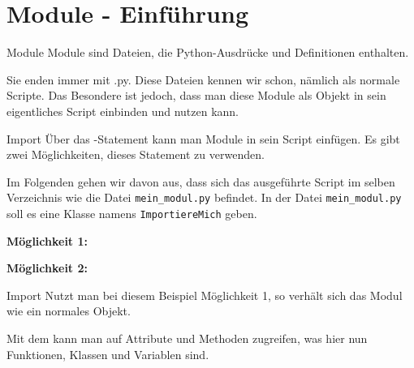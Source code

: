 \section{Module - Einführung}
\begin{frame}{Module}
	Module sind Dateien, die Python-Ausdrücke und Definitionen enthalten. 
	
	Sie enden immer mit \alert{.py}. Diese Dateien kennen wir schon, nämlich als normale Scripte. Das Besondere ist jedoch, dass man diese Module als Objekt in sein eigentliches Script einbinden und nutzen kann.
	
\end{frame}

\begin{frame}{Import}
	Über das -Statement kann man Module in sein Script einfügen. Es gibt zwei Möglichkeiten, dieses Statement zu verwenden.
	
	 Im Folgenden gehen wir davon aus, dass sich das ausgeführte Script im selben Verzeichnis wie die Datei \texttt{mein\_modul.py} befindet. In der Datei \texttt{mein\_modul.py} soll es eine Klasse namens \texttt{ImportiereMich} geben.
	 \pause
	
	\textbf{Möglichkeit 1:}
		
		\pause
	\textbf{Möglichkeit 2:}
		
	
\end{frame}

\begin{frame}{Import}
	Nutzt man bei diesem Beispiel Möglichkeit 1, so verhält sich das Modul wie ein normales Objekt.
	
	Mit dem  kann man auf Attribute und Methoden zugreifen, was hier nun Funktionen, Klassen und Variablen sind.
	
\end{frame}

